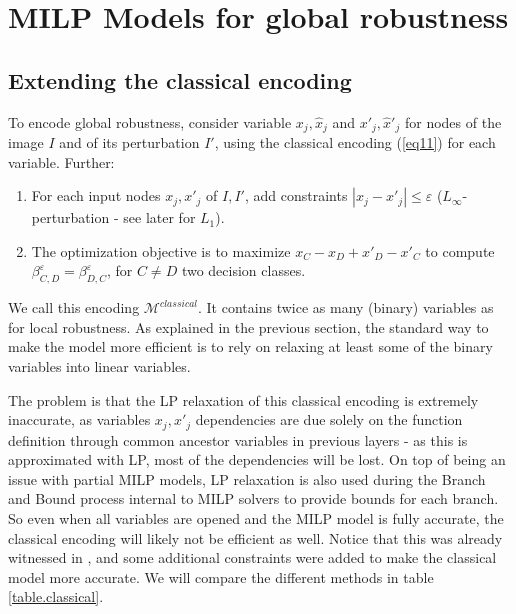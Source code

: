 	\section{MILP Models for global robustness}
	
	
	
	\subsection{Extending the classical encoding}
	
    To encode global robustness, \cite{lipshitz,vhagar} consider 
	variable $x_j,\hat{x}_j$ and $x'_j,\hat{x}'_j$ for nodes of the image $I$ 
	and of its perturbation $I'$,
    using the classical encoding (\ref{eq11}) \cite{MILP} for each variable.
    Further:
    \begin{enumerate}
		\item For each input nodes $x_j,x'_j$ of $I,I'$, add constraints
        $|x_j-x'_j| \leq \varepsilon$ 
        ($L_\infty$-perturbation - see later for $L_1$).
		\item The optimization objective is to maximize $x_C - x_D +x'_D - x'_C$ 
		to compute $\beta^\varepsilon_{C,D}=\beta^\varepsilon_{D,C}$, 
		for $C \neq D$ two decision classes.
	\end{enumerate}

	We call this encoding $\mathcal{M}^{classical}$.
	It contains twice as many (binary) variables as for local robustness. 
	As explained in the previous section, the standard way to make the model more efficient is to rely on relaxing at least some of the binary variables into linear variables.

    The problem is that the LP relaxation of this classical encoding is extremely inaccurate, as variables $x_j,x'_j$ dependencies are due solely on the function definition through common ancestor variables in previous layers - as this is approximated with LP, most of the dependencies will be lost. On top of being an issue with partial MILP models, LP relaxation is also used during the Branch and Bound process internal to MILP solvers to provide bounds for each branch. So even when all variables are opened and the MILP model is fully accurate, the classical encoding will likely not be efficient as well. Notice that this was already witnessed in \cite{lipshitz}, and some additional constraints were added to make the classical model more accurate. We will compare the different methods in table \ref{table.classical}.

